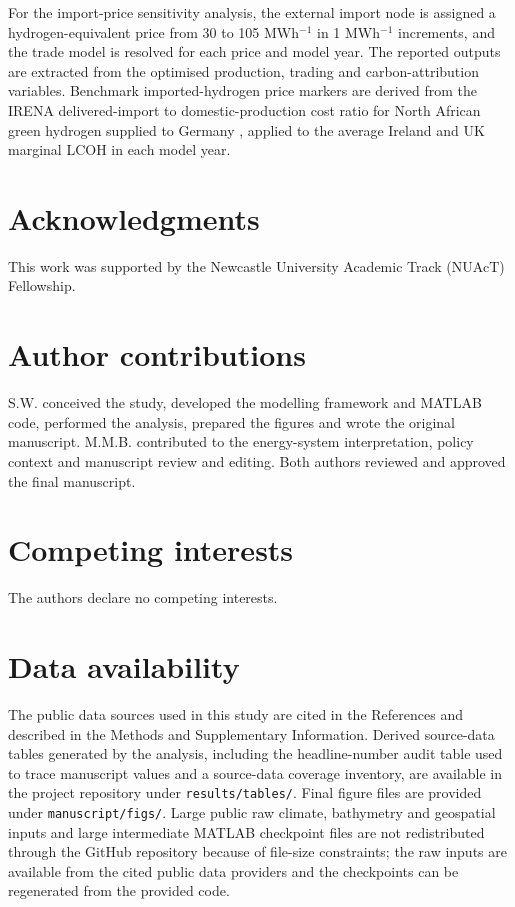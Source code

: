 \documentclass[pdflatex,sn-mathphys,Numbered]{sn-jnl}%
\begin{document}
For the import-price sensitivity analysis, the external import node is assigned a hydrogen-equivalent price from 30 to 105 \texteuro{} MWh$^{-1}$ in 1 \texteuro{} MWh$^{-1}$ increments, and the trade model is resolved for each price and model year. The reported outputs are extracted from the optimised production, trading and carbon-attribution variables. Benchmark imported-hydrogen price markers are derived from the IRENA delivered-import to domestic-production cost ratio for North African green hydrogen supplied to Germany \cite{IRENAGlobalHydrogenTradeOutlook2022}, applied to the average Ireland and UK marginal LCOH in each model year.

\backmatter

\section*{Acknowledgments}

This work was supported by the Newcastle University Academic Track (NUAcT) Fellowship.

\section*{Author contributions}

S.W. conceived the study, developed the modelling framework and MATLAB code, performed the analysis, prepared the figures and wrote the original manuscript. M.M.B. contributed to the energy-system interpretation, policy context and manuscript review and editing. Both authors reviewed and approved the final manuscript.

\section*{Competing interests}

The authors declare no competing interests.

\section*{Data availability}

The public data sources used in this study are cited in the References and described in the Methods and Supplementary Information. Derived source-data tables generated by the analysis, including the headline-number audit table used to trace manuscript values and a source-data coverage inventory, are available in the project repository under \verb|results/tables/|. Final figure files are provided under \verb|manuscript/figs/|. Large public raw climate, bathymetry and geospatial inputs and large intermediate MATLAB checkpoint files are not redistributed through the GitHub repository because of file-size constraints; the raw inputs are available from the cited public data providers and the checkpoints can be regenerated from the provided code.
\end{document}
